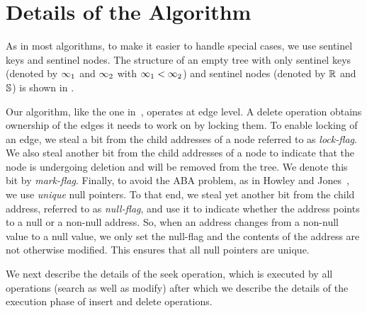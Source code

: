 \section{Details of the Algorithm}
As in most algorithms, to make it easier to handle special cases, we use sentinel keys and sentinel nodes.  The structure of an empty tree with only sentinel keys (denoted by $\infty_1$ and $\infty_2$ with $\infty_1{} < \infty_2{}$) and sentinel nodes (denoted by $\mathbb{R}$ and $\mathbb{S}$) is shown in .


Our algorithm, like the one in~\cite{NatMit:2014:PPoPP}, operates at edge level. A delete operation obtains ownership of the edges it needs to work on by locking them. To enable locking of an edge, we steal a bit from the child addresses of a node referred to as \emph{lock-flag}. We also steal another bit from the child addresses of a node to indicate that the node is undergoing deletion and will be removed from the tree. We denote this bit by \emph{mark-flag}. 
Finally, to avoid the ABA problem, as in Howley and Jones~\cite{HowJon:2012:SPAA}, we use \emph{unique} null pointers. To that end, we steal yet another bit from the child address, referred to as \emph{null-flag}, and use it to indicate whether the address points to a null or a non-null address. So, when an address changes from a non-null value to a null value, we only set the null-flag and the contents of the address are not otherwise modified. This ensures that all null pointers are unique.

We next describe the details of the seek operation, which is executed by all operations (search as well as modify) after which we describe the details of the execution phase of insert and delete operations.

